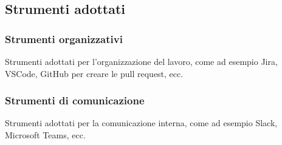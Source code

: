 \subsection{Strumenti adottati}
\label{sez:strumenti-adottati}

\subsubsection{Strumenti organizzativi}
\label{sez:strumenti-organizzativi}

Strumenti adottati per l'organizzazione del lavoro, come ad esempio Jira, VSCode, GitHub per creare le pull request, ecc.

\subsubsection{Strumenti di comunicazione}
\label{sez:strumenti-comunicazione}

Strumenti adottati per la comunicazione interna, come ad esempio Slack, Microsoft Teams, ecc.